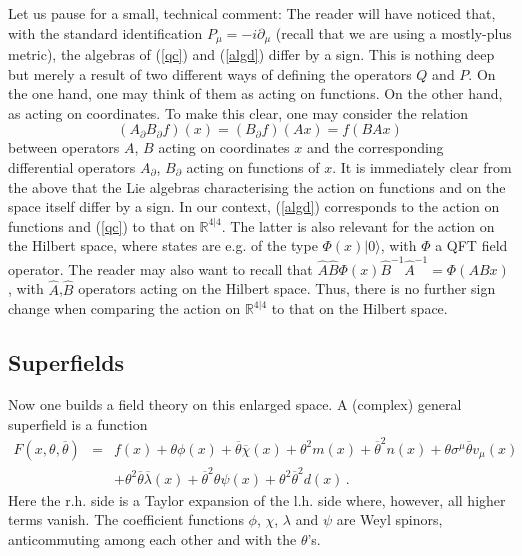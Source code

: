 \documentclass[12pt]{article}
\newcommand{\be}{\begin{equation}}
\newcommand{\ee}{\end{equation}}
\newcommand{\bea}{\begin{eqnarray}}
\newcommand{\eea}{\end{eqnarray}}
\newcommand{\ol}{\overline}
\numberwithin{equation}{section}
\begin{document}
Let us pause for a small, technical comment: The reader will have noticed that, with the standard identification $P_\mu=-i\partial_\mu$ (recall that we are using a mostly-plus metric), the algebras of (\ref{qc}) and (\ref{algd}) differ by a sign. This is nothing deep but merely a result of two different ways of defining the operators $Q$ and $P$. On the one hand, one may think of them as acting on functions. On the other hand, as acting on coordinates. To make this clear, one may consider the relation 
\be
(A_\partial B_\partial f)(x)=(B_\partial f)(Ax)=f(BAx)
\ee
between operators $A$, $B$ acting on coordinates $x$ and the corresponding differential operators $A_\partial$, $B_\partial$ acting on functions of $x$. It is immediately clear from the above that the Lie algebras characterising the action on functions and on the space itself differ by a sign. In our context, (\ref{algd}) corresponds to the action on functions and (\ref{qc}) to that on $\mathbb{R}^{4|4}$. The latter is also relevant for the action on the Hilbert space, where states are e.g. of the type $\Phi(x)|0\rangle$, with $\Phi$ a QFT field operator. The reader may also want to recall that $\hat{A}\hat{B}\Phi(x)\hat{B}^{-1}\hat{A}^{-1}=\Phi(ABx)$, with $\hat{A}$,$\hat{B}$ operators acting on the Hilbert space. Thus, there is no further sign change when comparing the action on $\mathbb{R}^{4|4}$ to that on the Hilbert space.





\subsection{Superfields}
Now one builds a field theory on this enlarged space. A (complex) general superfield is a function
\bea
F(x,\theta,\ol{\theta})& =&f(x)+\theta\phi(x)+\ol{\theta}\ol{\chi}(x)+ \theta^2m(x) +\ol{\theta}^2n(x)+\theta\sigma^\mu\ol{\theta}v_\mu(x)
\nonumber \\
&&+\theta^2\ol{\theta}\ol{\lambda}(x)+\ol{\theta}^2\theta\psi(x)+\theta^2 \ol{\theta}^2d(x)\,.\label{gsf}
\eea
Here the r.h. side is a Taylor expansion of the l.h. side where, however, all higher terms vanish. The coefficient functions $\phi$, $\chi$, $\lambda$ and $\psi$ are Weyl spinors, anticommuting among each other and with the $\theta$'s. 
\end{document}
